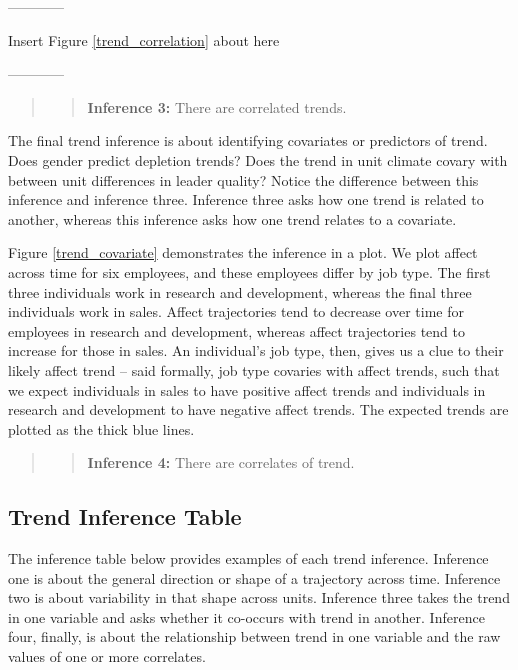 \documentclass[english,,man]{apa6}
\theoremstyle{definition}
\theoremstyle{definition}
\theoremstyle{definition}
\theoremstyle{remark}
\begin{document}
\begin{center}

------------

Insert Figure \ref{trend_correlation} about here

------------

\end{center}

\begin{quote}
\begin{quote}
\textbf{Inference 3:} There are correlated trends.
\end{quote}
\end{quote}

The final trend inference is about identifying covariates or predictors
of trend. Does gender predict depletion trends? Does the trend in unit
climate covary with between unit differences in leader quality? Notice
the difference between this inference and inference three. Inference
three asks how one trend is related to another, whereas this inference
asks how one trend relates to a covariate.

Figure \ref{trend_covariate} demonstrates the inference in a plot. We
plot affect across time for six employees, and these employees differ by
job type. The first three individuals work in research and development,
whereas the final three individuals work in sales. Affect trajectories
tend to decrease over time for employees in research and development,
whereas affect trajectories tend to increase for those in sales. An
individual's job type, then, gives us a clue to their likely affect
trend -- said formally, job type covaries with affect trends, such that
we expect individuals in sales to have positive affect trends and
individuals in research and development to have negative affect trends.
The expected trends are plotted as the thick blue lines.

\begin{quote}
\begin{quote}
\textbf{Inference 4:} There are correlates of trend.
\end{quote}
\end{quote}

\hypertarget{trend-inference-table}{%
\subsection{Trend Inference Table}\label{trend-inference-table}}

The inference table below provides examples of each trend inference.
Inference one is about the general direction or shape of a trajectory
across time. Inference two is about variability in that shape across
units. Inference three takes the trend in one variable and asks whether
it co-occurs with trend in another. Inference four, finally, is about
the relationship between trend in one variable and the raw values of one
or more correlates.
\end{document}
